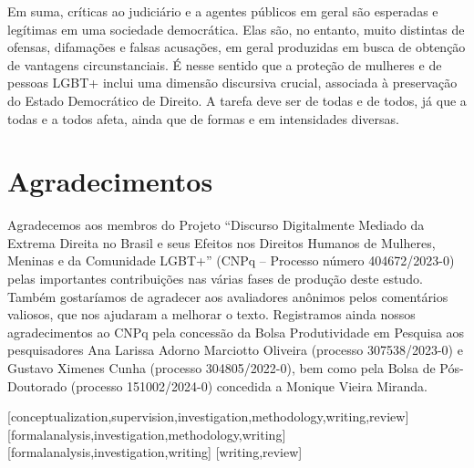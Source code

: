 \documentclass[portuguese]{textolivre}
\begin{document}
Em suma, críticas ao judiciário e a agentes públicos em geral são esperadas e legítimas em uma sociedade democrática. Elas são, no entanto, muito distintas de ofensas, difamações e falsas acusações, em geral produzidas em busca de obtenção de vantagens circunstanciais. É nesse sentido que a proteção de mulheres e de pessoas LGBT+ inclui uma dimensão discursiva crucial, associada à preservação do Estado Democrático de Direito. A tarefa deve ser de todas e de todos, já que a todas e a todos afeta, ainda que de formas e em intensidades diversas.

\section*{Agradecimentos}
Agradecemos aos membros do Projeto ``Discurso Digitalmente Mediado da Extrema Direita no Brasil e seus Efeitos nos Direitos Humanos de Mulheres, Meninas e da Comunidade LGBT+'' (CNPq – Processo número 404672/2023-0) pelas importantes contribuições nas várias fases de produção deste estudo. Também gostaríamos de agradecer aos avaliadores anônimos pelos comentários valiosos, que nos ajudaram a melhorar o texto. Registramos ainda nossos agradecimentos ao CNPq pela concessão da Bolsa Produtividade em Pesquisa aos pesquisadores Ana Larissa Adorno Marciotto Oliveira (processo 307538/2023-0) e Gustavo Ximenes Cunha (processo 304805/2022-0), bem como pela Bolsa de Pós-Doutorado (processo 151002/2024-0) concedida a Monique Vieira Miranda.



\printbibliography\label{sec-bib}


\begin{contributors}
[conceptualization,supervision,investigation,methodology,writing,review]
[formalanalysis,investigation,methodology,writing]
[formalanalysis,investigation,writing]
[writing,review]
\end{contributors}


\
\end{document}
